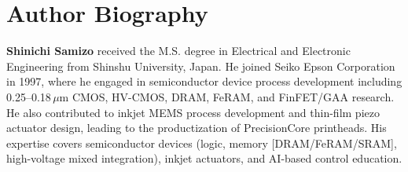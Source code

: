 \documentclass[journal]{IEEEtran}
\begin{document}



\section*{Author Biography}
\textbf{Shinichi Samizo} received the M.S. degree in Electrical and Electronic Engineering from Shinshu University, Japan. He joined Seiko Epson Corporation in 1997, where he engaged in semiconductor device process development including 0.25--0.18\,$\mu$m CMOS, HV-CMOS, DRAM, FeRAM, and FinFET/GAA research. He also contributed to inkjet MEMS process development and thin-film piezo actuator design, leading to the productization of PrecisionCore printheads. His expertise covers semiconductor devices (logic, memory \mbox{[DRAM/FeRAM/SRAM]}, high-voltage mixed integration), inkjet actuators, and AI-based control education.
\end{document}
